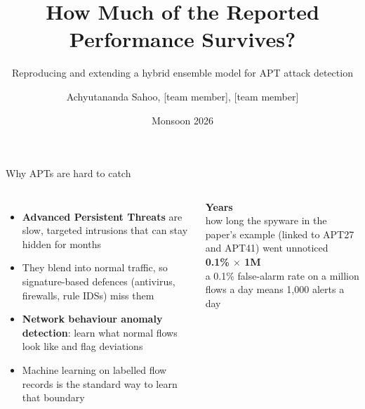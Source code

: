 \documentclass[aspectratio=169,11pt]{beamer}
\title{How Much of the Reported Performance Survives?}
\subtitle{Reproducing and extending a hybrid ensemble model for APT attack detection}
\author{Achyutananda Sahoo, [team member], [team member]}
\institute{Research in Information Security \quad$\cdot$\quad IIIT Hyderabad}
\date{Monsoon 2026}
\newcommand{\bignum}[1]{{\Large\bfseries #1}}
\begin{document}
\maketitle

\begin{frame}{Why APTs are hard to catch}
\begin{columns}[T]
\begin{itemize}
  \item \textbf{Advanced Persistent Threats} are slow, targeted intrusions that can stay hidden for months
  \item They blend into normal traffic, so \alert{signature-based} defences (antivirus, firewalls, rule IDSs) miss them
  \item \textbf{Network behaviour anomaly detection}: learn what normal flows look like and flag deviations
  \item Machine learning on labelled flow records is the standard way to learn that boundary
\end{itemize}
\vspace{6mm}
\begin{center}
\bignum{Years}\\[2pt]
{\small how long the spyware in the paper's example (linked to APT27 and APT41) went unnoticed}\\[14pt]
\bignum{0.1\% $\times$ 1M}\\[2pt]
{\small a 0.1\% false-alarm rate on a million flows a day means 1{,}000 alerts a day}
\end{center}
\end{columns}
\end{frame}
\end{document}
